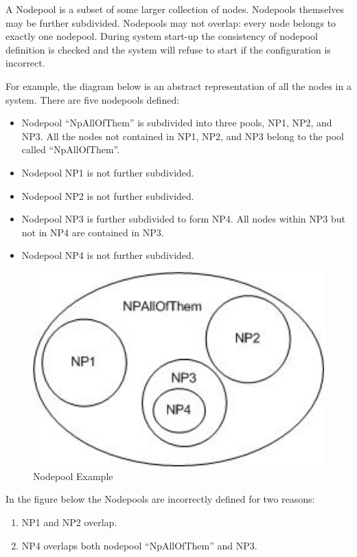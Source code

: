     A Nodepool is a subset of some larger collection of nodes.  Nodepools themselves may be
    further subdivided.  Nodepools may not overlap: every node belongs to exactly
    one nodepool.  During system start-up the consistency of nodepool definition is checked
    and the system will refuse to start if the configuration is incorrect.

    For example, the diagram below is an abstract representation of all the nodes in a
    system.  There are five nodepools defined:
    \begin{itemize}
      \item Nodepool ``NpAllOfThem'' is subdivided into three pools, NP1, NP2, and NP3.  All
        the nodes not contained in NP1, NP2, and NP3 belong to the pool called ``NpAllOfThem''.
      \item Nodepool NP1 is not further subdivided.
      \item Nodepool NP2 is not further subdivided.
      \item Nodepool NP3 is further subdivided to form NP4.  All nodes within NP3 but
        not in NP4 are contained in NP3.
      \item Nodepool NP4 is not further subdivided.
    \end{itemize}

    \begin{figure}[H]
      \centering
      \includegraphics[width=5.5in]{images/Nodepool1.jpg}
      \caption{Nodepool Example}
      \label{fig:Nodepools1}
    \end{figure}

    In the figure below the Nodepools are incorrectly defined for two reasons:
    \begin{enumerate}
       \item NP1 and NP2 overlap.
       \item NP4 overlaps both nodepool ``NpAllOfThem'' and NP3.
    \end{enumerate}
    
